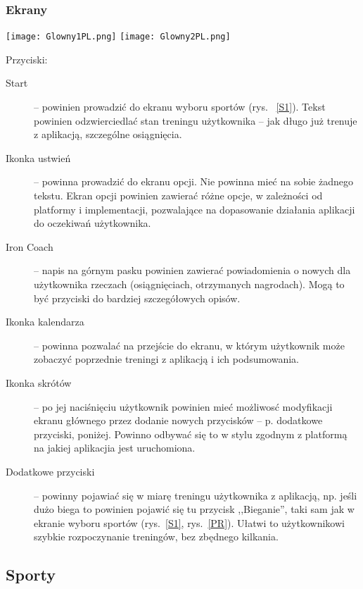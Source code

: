 \subsubsection{Ekrany}
\begin{minipage}{0.5\textwidth}
  \label{G1}
  \texttt{[image: Glowny1PL.png]}
  \label{G2}
  \texttt{[image: Glowny2PL.png]}
\end{minipage}
\begin{minipage}{0.5\textwidth}
Przyciski:\\
\begin{description}
  \item[Start] -- powinien prowadzić do ekranu wyboru sportów (rys. ~\ref{S1}). Tekst powinien odzwierciedlać stan treningu użytkownika -- jak długo już trenuje z aplikacją, szczególne osiągnięcia.
  \item[Ikonka ustwień] -- powinna prowadzić do ekranu opcji. Nie powinna mieć na sobie żadnego tekstu. Ekran opcji powinien zawierać różne opcje, w zależności od platformy i implementacji, pozwalające na dopasowanie działania aplikacji do oczekiwań użytkownika.
  \item[Iron Coach] -- napis na górnym pasku powinien zawierać powiadomienia o nowych dla użytkownika rzeczach (osiągnięciach, otrzymanych nagrodach). Mogą to być przyciski do bardziej szczegółowych opisów.
  \item[Ikonka kalendarza] -- powinna pozwalać na przejście do ekranu, w którym użytkownik może zobaczyć poprzednie treningi z aplikacją i ich podsumowania.
  \item[Ikonka skrótów] -- po jej naciśnięciu użytkownik powinien mieć możliwosć modyfikacji ekranu głównego przez dodanie nowych przycisków -- p. dodatkowe przyciski, poniżej. Powinno odbywać się to w stylu zgodnym z platformą na jakiej aplikacjia jest uruchomiona.
  \item[Dodatkowe przyciski] -- powinny pojawiać się w miarę treningu użytkownika z aplikacją, np. jeśli dużo biega to powinien pojawić się tu przycisk ,,Bieganie'', taki sam jak w ekranie wyboru sportów (rys.~\ref{S1}, rys.~\ref{PR}). Ułatwi to użytkownikowi szybkie rozpoczynanie treningów, bez zbędnego kilkania.
\end{description}
\end{minipage}
\subsection{Sporty}

